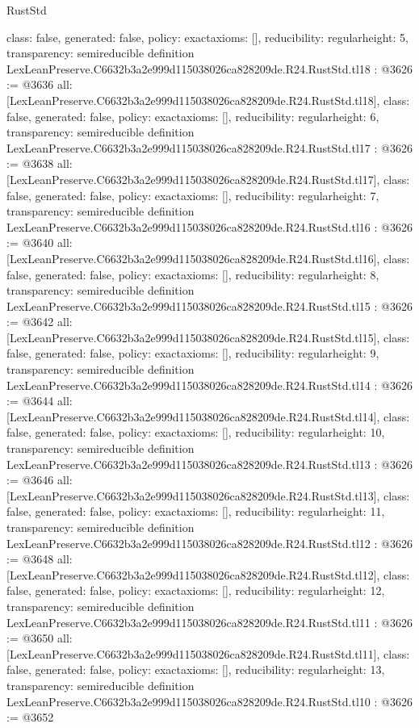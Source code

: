 \begin{lexlean}{RustStd}
\begin{coremodule}
{  class: false,
  generated: false,
  policy: exact{axioms: []},
  reducibility: regular{height: 5},
  transparency: semireducible
}
definition LexLeanPreserve.C6632b3a2e999d115038026ca828209de.R24.RustStd.tl18 : @3626 := @3636 {
  all: [LexLeanPreserve.C6632b3a2e999d115038026ca828209de.R24.RustStd.tl18],
  class: false,
  generated: false,
  policy: exact{axioms: []},
  reducibility: regular{height: 6},
  transparency: semireducible
}
definition LexLeanPreserve.C6632b3a2e999d115038026ca828209de.R24.RustStd.tl17 : @3626 := @3638 {
  all: [LexLeanPreserve.C6632b3a2e999d115038026ca828209de.R24.RustStd.tl17],
  class: false,
  generated: false,
  policy: exact{axioms: []},
  reducibility: regular{height: 7},
  transparency: semireducible
}
definition LexLeanPreserve.C6632b3a2e999d115038026ca828209de.R24.RustStd.tl16 : @3626 := @3640 {
  all: [LexLeanPreserve.C6632b3a2e999d115038026ca828209de.R24.RustStd.tl16],
  class: false,
  generated: false,
  policy: exact{axioms: []},
  reducibility: regular{height: 8},
  transparency: semireducible
}
definition LexLeanPreserve.C6632b3a2e999d115038026ca828209de.R24.RustStd.tl15 : @3626 := @3642 {
  all: [LexLeanPreserve.C6632b3a2e999d115038026ca828209de.R24.RustStd.tl15],
  class: false,
  generated: false,
  policy: exact{axioms: []},
  reducibility: regular{height: 9},
  transparency: semireducible
}
definition LexLeanPreserve.C6632b3a2e999d115038026ca828209de.R24.RustStd.tl14 : @3626 := @3644 {
  all: [LexLeanPreserve.C6632b3a2e999d115038026ca828209de.R24.RustStd.tl14],
  class: false,
  generated: false,
  policy: exact{axioms: []},
  reducibility: regular{height: 10},
  transparency: semireducible
}
definition LexLeanPreserve.C6632b3a2e999d115038026ca828209de.R24.RustStd.tl13 : @3626 := @3646 {
  all: [LexLeanPreserve.C6632b3a2e999d115038026ca828209de.R24.RustStd.tl13],
  class: false,
  generated: false,
  policy: exact{axioms: []},
  reducibility: regular{height: 11},
  transparency: semireducible
}
definition LexLeanPreserve.C6632b3a2e999d115038026ca828209de.R24.RustStd.tl12 : @3626 := @3648 {
  all: [LexLeanPreserve.C6632b3a2e999d115038026ca828209de.R24.RustStd.tl12],
  class: false,
  generated: false,
  policy: exact{axioms: []},
  reducibility: regular{height: 12},
  transparency: semireducible
}
definition LexLeanPreserve.C6632b3a2e999d115038026ca828209de.R24.RustStd.tl11 : @3626 := @3650 {
  all: [LexLeanPreserve.C6632b3a2e999d115038026ca828209de.R24.RustStd.tl11],
  class: false,
  generated: false,
  policy: exact{axioms: []},
  reducibility: regular{height: 13},
  transparency: semireducible
}
definition LexLeanPreserve.C6632b3a2e999d115038026ca828209de.R24.RustStd.tl10 : @3626 := @3652 {
}
\end{coremodule}
\end{lexlean}

